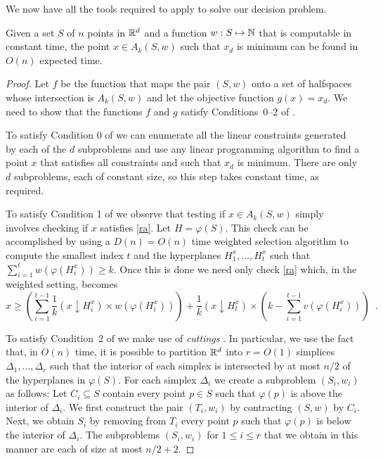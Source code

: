 \documentclass[lotsofwhite]{patmorin}
\newcommand{\drop}{\!\!\downarrow\!\!}
\newcommand{\dual}{\varphi}
\begin{document}
We now have all the tools required to apply  to solve our
decision problem.

\begin{thm}
Given a set $S$ of $n$ points in $\mathbb{R}^d$ and a 
function $w:S\mapsto\mathbb{N}$ that is computable in constant
time, the point $x\in A_k(S,w)$ such
that $x_d$ is minimum can be found in $O(n)$ expected
time.
\end{thm}

\begin{proof}
Let $f$ be the function that maps the pair $(S,w)$ onto a set of
halfspaces whose intersection is $A_k(S,w)$ and let the objective
function $g(x)=x_d$.  We need to show that the functions $f$ and $g$
satisfy Conditions~0--2 of .

To satisfy Condition 0 of  we can enumerate all the
linear constraints generated by each of the $d$ subproblems and use
any linear programming algorithm to find a point $x$ that satisfies
all constraints and such that $x_d$ is minimum.  There are only $d$
subproblems, each of constant size, so this step takes constant time,
as required.

To satisfy Condition 1 of  we observe that testing if
$x\in A_k(S,w)$ simply involves checking if $x$ satisfies \eqref{ra}.
Let $H=\dual(S)$.  This check can be accomplished by using a
$D(n)=O(n)$ time weighted selection algorithm
\cite[Exercise~9-2]{clrs01} to compute the smallest index $t$ and the
hyperplanes $H_{1}^x,\ldots,H_{t}^x$ such that
$\sum_{i=1}^tw(\dual(H_{i}^x)) \ge k$.  Once this is done we need only
check \eqref{ra} which, in the weighted setting, becomes 
\[
     x \ge \left(\sum_{i=1}^{t-1} \frac{1}{k}(x\drop
H_i^x)\times w(\dual(H_i^x))\right) 
   + \frac{1}{k}(x\drop H_t^x) \times \left(k-\sum_{i=1}^{t-1} v(\dual(H_{i}^x)) \right)
\enspace .
\]

To satisfy Condition~2 of  we make use of \emph{cuttings}
\cite[Section~6.5]{mat02}.  In particular, we use the fact that, in
$O(n)$ time, it is possible to partition $\mathbb{R}^d$ into $r=O(1)$
simplices $\Delta_1,\ldots,\Delta_r$ such that the interior of each
simplex is intersected by at most $n/2$ of the hyperplanes in
$\dual(S)$.  For each simplex $\Delta_i$ we create a subproblem
$(S_i,w_i)$ as follows: Let $C_i\subseteq S$ contain every point $p\in
S$ such that $\dual(p)$ is above the interior of $\Delta_i$.  We first
construct the pair $(T_i,w_i)$ by contracting $(S,w)$ by $C_i$.  Next,
we obtain $S_i$ by removing from $T_i$ every point $p$ such that
$\dual(p)$ is below the interior of $\Delta_i$.  The subproblems
$(S_i,w_i)$ for $1\le i\le r$ that we obtain in this manner are each
of size at most $n/2+2$.


\end{proof}
\end{document}
